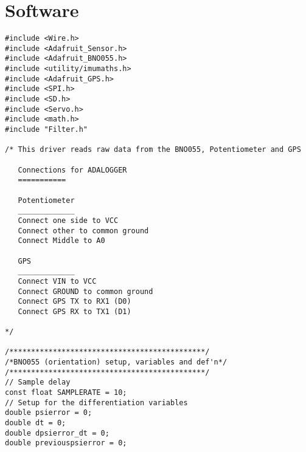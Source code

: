 \chapter{Software}\label{app:software}
\begin{lstlisting}[language=Arduino]  
#include <Wire.h>
#include <Adafruit_Sensor.h>
#include <Adafruit_BNO055.h>
#include <utility/imumaths.h>
#include <Adafruit_GPS.h>
#include <SPI.h>
#include <SD.h>
#include <Servo.h>
#include <math.h>
#include "Filter.h"

/* This driver reads raw data from the BNO055, Potentiometer and GPS

   Connections for ADALOGGER
   ===========

   Potentiometer
   _____________
   Connect one side to VCC
   Connect other to common ground
   Connect Middle to A0

   GPS
   _____________
   Connect VIN to VCC
   Connect GROUND to common ground
   Connect GPS TX to RX1 (D0)
   Connect GPS RX to TX1 (D1)

*/

/*********************************************/
/*BNO055 (orientation) setup, variables and def'n*/
/*********************************************/
// Sample delay
const float SAMPLERATE = 10;
// Setup for the differentiation variables
double psierror = 0;
double dt = 0;
double dpsierror_dt = 0;
double previouspsierror = 0;

\end{lstlisting}